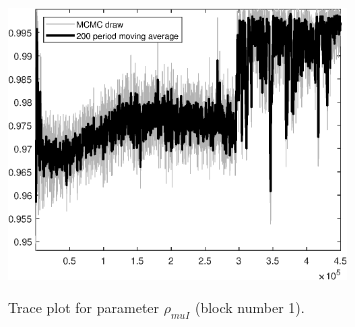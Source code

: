\begin{figure}[H]
\centering
  \includegraphics[width=0.8\textwidth]{BRS_sectoral_wo_vcu/graphs/TracePlot_rho_muI_blck_1}\\
    \caption{Trace plot for parameter ${\rho_{muI}}$ (block number 1).}
\end{figure}
